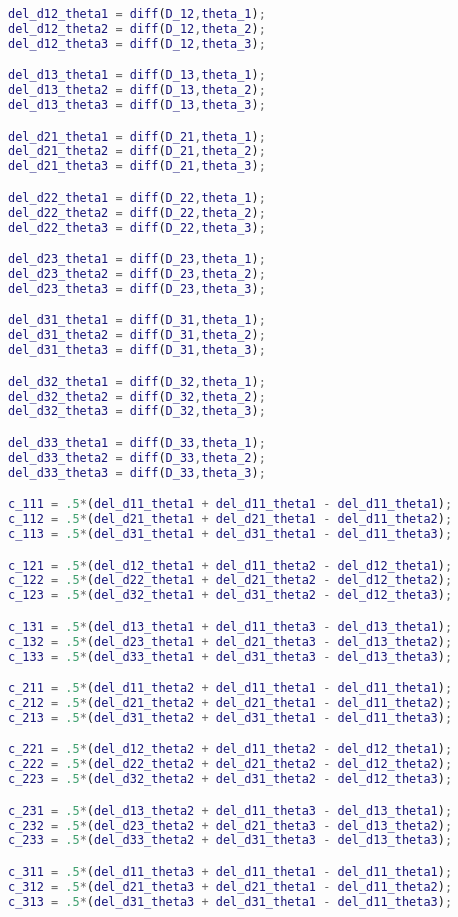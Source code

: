 \begin{anexosenv}
\begin{lstlisting}[language=Matlab]
del_d12_theta1 = diff(D_12,theta_1);
del_d12_theta2 = diff(D_12,theta_2);
del_d12_theta3 = diff(D_12,theta_3);

del_d13_theta1 = diff(D_13,theta_1);
del_d13_theta2 = diff(D_13,theta_2);
del_d13_theta3 = diff(D_13,theta_3);

del_d21_theta1 = diff(D_21,theta_1);
del_d21_theta2 = diff(D_21,theta_2);
del_d21_theta3 = diff(D_21,theta_3);

del_d22_theta1 = diff(D_22,theta_1);
del_d22_theta2 = diff(D_22,theta_2);
del_d22_theta3 = diff(D_22,theta_3);

del_d23_theta1 = diff(D_23,theta_1);
del_d23_theta2 = diff(D_23,theta_2);
del_d23_theta3 = diff(D_23,theta_3);

del_d31_theta1 = diff(D_31,theta_1);
del_d31_theta2 = diff(D_31,theta_2);
del_d31_theta3 = diff(D_31,theta_3);

del_d32_theta1 = diff(D_32,theta_1);
del_d32_theta2 = diff(D_32,theta_2);
del_d32_theta3 = diff(D_32,theta_3);

del_d33_theta1 = diff(D_33,theta_1);
del_d33_theta2 = diff(D_33,theta_2);
del_d33_theta3 = diff(D_33,theta_3);

c_111 = .5*(del_d11_theta1 + del_d11_theta1 - del_d11_theta1);
c_112 = .5*(del_d21_theta1 + del_d21_theta1 - del_d11_theta2);
c_113 = .5*(del_d31_theta1 + del_d31_theta1 - del_d11_theta3);

c_121 = .5*(del_d12_theta1 + del_d11_theta2 - del_d12_theta1);
c_122 = .5*(del_d22_theta1 + del_d21_theta2 - del_d12_theta2);
c_123 = .5*(del_d32_theta1 + del_d31_theta2 - del_d12_theta3);

c_131 = .5*(del_d13_theta1 + del_d11_theta3 - del_d13_theta1);
c_132 = .5*(del_d23_theta1 + del_d21_theta3 - del_d13_theta2);
c_133 = .5*(del_d33_theta1 + del_d31_theta3 - del_d13_theta3);

c_211 = .5*(del_d11_theta2 + del_d11_theta1 - del_d11_theta1);
c_212 = .5*(del_d21_theta2 + del_d21_theta1 - del_d11_theta2);
c_213 = .5*(del_d31_theta2 + del_d31_theta1 - del_d11_theta3);

c_221 = .5*(del_d12_theta2 + del_d11_theta2 - del_d12_theta1);
c_222 = .5*(del_d22_theta2 + del_d21_theta2 - del_d12_theta2);
c_223 = .5*(del_d32_theta2 + del_d31_theta2 - del_d12_theta3);

c_231 = .5*(del_d13_theta2 + del_d11_theta3 - del_d13_theta1);
c_232 = .5*(del_d23_theta2 + del_d21_theta3 - del_d13_theta2);
c_233 = .5*(del_d33_theta2 + del_d31_theta3 - del_d13_theta3);

c_311 = .5*(del_d11_theta3 + del_d11_theta1 - del_d11_theta1);
c_312 = .5*(del_d21_theta3 + del_d21_theta1 - del_d11_theta2);
c_313 = .5*(del_d31_theta3 + del_d31_theta1 - del_d11_theta3);


\end{lstlisting}
\end{anexosenv}
